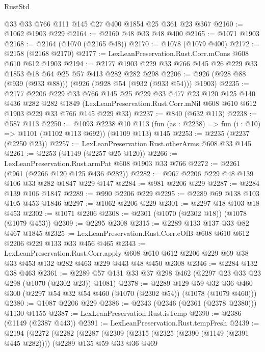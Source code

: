 \begin{lexlean}{RustStd}
\begin{coremodule}
{\begin{coremodule}
{{{{{{{{{{    @33
    @33
    @766
    @111
    @145
    @27
    @400
    @1854
    @25
    @361
    @23
    @367
@2160 := @1062 @1903 @229
@2164 := @2160 @48 @33 @48 @400
@2165 := @1071 @1903
@2168 := @2164 (@1070 (@2165 @48))
@2170 := @1078 (@1079 @400)
@2172 := @2158 (@2168 @2170)
@2177 := LexLeanPreservation.Rust.Corr.mCons @608 @610 @612 @1903
@2194 := @2177 @1903 @229 @33 @766 @145 @26 @229 @33 @1853 @18 @64 @25 @57 @413 @282 @282 @298
@2206 := @926 (@928 @88 (@939 (@933 @88))) (@926 (@928 @54 (@932 (@933 @54))) @1903)
@2235 := @2177
    @2206
    @229
    @33
    @766
    @145
    @25
    @229
    @33
    @477
    @23
    @120
    @125
    @140
    @436
    @282
    @282
    @1849
    (LexLeanPreservation.Rust.Corr.mNil @608 @610 @612 @1903 @229 @33 @766 @145 @229 @33)
@2237 := @840 (@632 @113)
@2238 := @587 @113
@2250 := @1093
    @2238
    @10
    @113
    (fun (as : @2238) => fun (i : @10) => @1101 (@1102 @113 @692))
    (@1109 @113)
    @145
@2253 := @2235 (@2237 (@2250 @23))
@2257 := LexLeanPreservation.Rust.otherArms @608 @33 @145
@2261 := @2253 (@1149 (@2257 @25 @120))
@2266 := LexLeanPreservation.Rust.armPat @608 @1903 @33 @766
@2272 := @2261 (@961 (@2266 @120 @125 @436 @282))
@2282 := @967 @2206 @229 @48 @139 @106 @33 @282 @1847 @229 @147
@2284 := @981 @2206 @229
@2287 := @2284 @139 @106 @1847
@2289 := @990 @2206 @229
@2295 := @2289 @69 @138 @103 @105 @453 @1846
@2297 := @1062 @2206 @229
@2301 := @2297 @18 @103 @18 @453
@2302 := @1071 @2206
@2308 := @2301 (@1070 (@2302 @18)) (@1078 (@1079 @453))
@2309 := @2295 @2308
@2315 := @2289 @133 @137 @33 @82 @467 @1845
@2325 := LexLeanPreservation.Rust.Corr.eOfB @608 @610 @612 @2206 @229 @133 @33 @456 @465
@2343 := LexLeanPreservation.Rust.Corr.apply
    @608
    @610
    @612
    @2206
    @229
    @69
    @38
    @33
    @453
    @132
    @282
    @463
    @229
    @443
    @48
    @450
    @2308
@2346 := @2284 @132 @38 @463
@2361 := @2289 @57 @131 @33 @37 @298 @462 (@2297 @23 @33 @23 @298 (@1070 (@2302 @23)) @1081)
@2378 := @2289
    @129
    @59
    @32
    @36
    @460
    @300
    (@2297 @54 @32 @54 @460 (@1070 (@2302 @54)) (@1078 (@1079 @460)))
@2380 := @1087 @2206 @229
@2386 := @2343 (@2346 (@2361 (@2378 @2380))) @1130 @1155
@2387 := LexLeanPreservation.Rust.isTemp
@2390 := @2386 (@1149 (@2387 @443))
@2391 := LexLeanPreservation.Rust.tempFresh
@2439 := @2194
    (@2272
      (@2282
        (@2287
          (@2309
            (@2315
              (@2325 (@2390 (@1149 (@2391 @445 @282))))
              (@2289
                @135
                @59
                @33
                @36
                @469
}}}}}}}}}}
\end{coremodule}}
\end{coremodule}
\end{lexlean}
